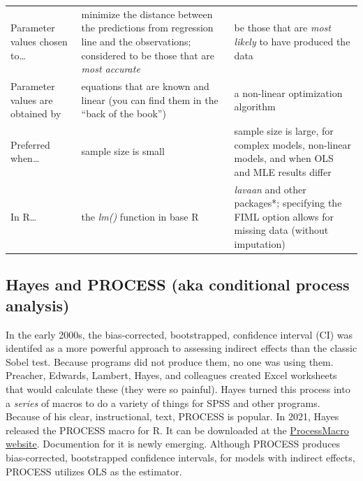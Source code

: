 \documentclass[
  11pt,
]{book}
\begin{document}
\begin{longtable}[]{@{}
  >{\centering\arraybackslash}p{}
  >{\centering\arraybackslash}p{}
  >{\centering\arraybackslash}p{}@{}}
\toprule\noalign{}
\endhead
\bottomrule\noalign{}
\endlastfoot
Parameter values chosen to\ldots{} & minimize the distance between the predictions from regression line and the observations; considered to be those that are \emph{most accurate} & be those that are \emph{most likely} to have produced the data \\
Parameter values are obtained by & equations that are known and linear (you can find them in the ``back of the book'') & a non-linear optimization algorithm \\
Preferred when\ldots{} & sample size is small & sample size is large, for complex models, non-linear models, and when OLS and MLE results differ \\
In R\ldots{} & the \emph{lm()} function in base R & \emph{lavaan} and other packages*; specifying the FIML option allows for missing data (without imputation) \\
\end{longtable}

\hypertarget{hayes-and-process-aka-conditional-process-analysis}{%
\subsection{Hayes and PROCESS (aka conditional process analysis)}\label{hayes-and-process-aka-conditional-process-analysis}}

In the early 2000s, the bias-corrected, bootstrapped, confidence interval (CI) was identifed as a more powerful approach to assessing indirect effects than the classic Sobel test. Because programs did not produce them, no one was using them. Preacher, Edwards, Lambert, Hayes, and colleagues created Excel worksheets that would calculate these (they were so painful). Hayes turned this process into a \emph{series} of macros to do a variety of things for SPSS and other programs. Because of his clear, instructional, text, PROCESS is popular. In 2021, Hayes released the PROCESS macro for R. It can be downloaded at the \href{https://www.processmacro.org/download.html}{ProcessMacro website}. Documention for it is newly emerging. Although PROCESS produces bias-corrected, bootstrapped confidence intervals, for models with indirect effects, PROCESS utilizes OLS as the estimator.
\end{document}
